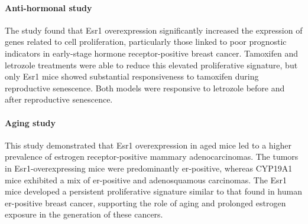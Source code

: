 \paragraph{Anti-hormonal study}
The study found that Esr1 overexpression significantly increased the expression
of genes related to cell proliferation, particularly those linked to poor
prognostic indicators in early-stage hormone receptor-positive breast cancer.
Tamoxifen and letrozole treatments were able to reduce this elevated
proliferative signature, but only Esr1 mice showed substantial responsiveness
to tamoxifen during reproductive senescence.
Both models were responsive to letrozole before and after reproductive
senescence\supercite{furth_esr1_2023}.

\paragraph{Aging study}
This study demonstrated that Esr1 overexpression in aged mice led to a higher
prevalence of estrogen receptor-positive mammary adenocarcinomas.
The tumors in Esr1-overexpressing mice were predominantly \gls{er}-positive,
whereas CYP19A1 mice exhibited a mix of \gls{er}-positive and adenosquamous
carcinomas.
The Esr1 mice developed a persistent proliferative signature similar to that
found in human \gls{er}-positive breast cancer, supporting the role of aging
and prolonged estrogen exposure in the generation of these
cancers\supercite{furth_overexpression_2023}.
